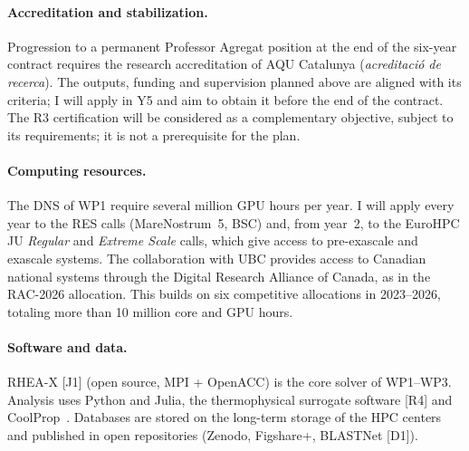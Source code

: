 \documentclass[11pt]{article}
\begin{document}
\paragraph{Accreditation and stabilization.} Progression to a permanent Professor Agregat
position at the end of the six-year contract requires the research accreditation of AQU
Catalunya (\emph{acreditaci\'o de recerca}). The outputs, funding and supervision planned
above are aligned with its criteria; I will apply in Y5 and aim to obtain it before the end
of the contract. The R3 certification will be considered as a complementary objective, subject
to its requirements; it is not a prerequisite for the plan.

\paragraph{Computing resources.} The DNS of WP1 require several million GPU hours per year. I will apply every year to the RES calls (MareNostrum~5, BSC) and, from year~2, to
the EuroHPC JU \emph{Regular} and \emph{Extreme Scale} calls, which give access to
pre-exascale and exascale systems. The collaboration with UBC provides access to Canadian
national systems through the Digital Research Alliance of Canada, as in the RAC-2026
allocation. This builds on six competitive allocations in 2023--2026, totaling more than 10
million core and GPU hours.

\paragraph{Software and data.} RHEA-X [J1] (open source, MPI + OpenACC) is the core solver of
WP1--WP3. Analysis uses Python and Julia, the thermophysical surrogate software [R4] and
CoolProp~\cite{CoolProp2014}. Databases are stored on the long-term storage of the HPC centers
and published in open repositories (Zenodo, Figshare+, BLASTNet [D1]).
\end{document}
